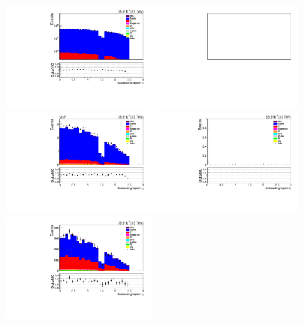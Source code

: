 \begin{figure}[ht]
\centering
\includegraphics[width=0.49\textwidth]{figs/background-estimation/plots/unblinded/prompt_ee_ttbarInc/lep2Eta_NPL_ee_lepSel_ee_log.pdf}
\includegraphics[width=0.49\textwidth]{figs/background-estimation/plots/unblinded/prompt_mumu_ttbarInc/lep2Eta_NPL_mumu_lepSel_mumu_log.pdf}
\\
\includegraphics[width=0.49\textwidth]{figs/background-estimation/plots/unblinded/prompt_ee_ttbarInc/lep2Eta_NPL_ee_jetSel_ee.pdf}
\includegraphics[width=0.49\textwidth]{figs/background-estimation/plots/unblinded/prompt_mumu_ttbarInc/lep2Eta_NPL_mumu_jetSel_mumu.pdf}
\\
\includegraphics[width=0.49\textwidth]{figs/background-estimation/plots/unblinded/prompt_ee_ttbarInc/lep2Eta_NPL_ee_wMass_ee.pdf}

\end{figure}

